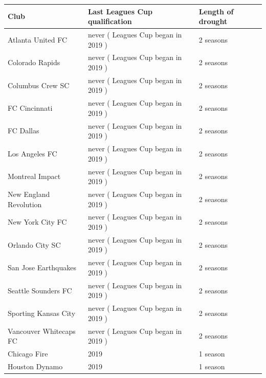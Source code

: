 \documentclass{article}
\begin{document}
\begin{tabular}{lll}
\toprule
Club & Last Leagues Cup qualification & Length of drought \\
\midrule
Atlanta United FC & never ( Leagues Cup began in 2019 ) & 2 seasons \\
Colorado Rapids & never ( Leagues Cup began in 2019 ) & 2 seasons \\
Columbus Crew SC & never ( Leagues Cup began in 2019 ) & 2 seasons \\
FC Cincinnati & never ( Leagues Cup began in 2019 ) & 2 seasons \\
FC Dallas & never ( Leagues Cup began in 2019 ) & 2 seasons \\
Los Angeles FC & never ( Leagues Cup began in 2019 ) & 2 seasons \\
Montreal Impact & never ( Leagues Cup began in 2019 ) & 2 seasons \\
New England Revolution & never ( Leagues Cup began in 2019 ) & 2 seasons \\
New York City FC & never ( Leagues Cup began in 2019 ) & 2 seasons \\
Orlando City SC & never ( Leagues Cup began in 2019 ) & 2 seasons \\
San Jose Earthquakes & never ( Leagues Cup began in 2019 ) & 2 seasons \\
Seattle Sounders FC & never ( Leagues Cup began in 2019 ) & 2 seasons \\
Sporting Kansas City & never ( Leagues Cup began in 2019 ) & 2 seasons \\
Vancouver Whitecaps FC & never ( Leagues Cup began in 2019 ) & 2 seasons \\
Chicago Fire & 2019 & 1 season \\
Houston Dynamo & 2019 & 1 season \\
\bottomrule
\end{tabular}
\end{document}
